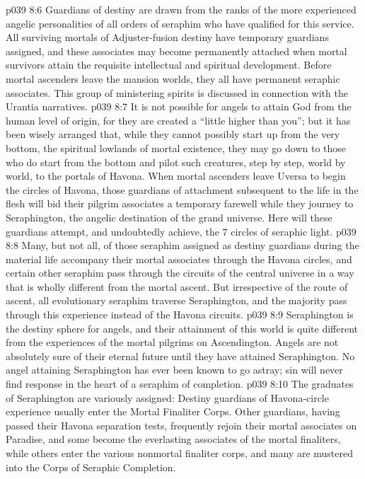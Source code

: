 \vs p039 8:6 Guardians of destiny are drawn from the ranks of the more experienced angelic personalities of all orders of seraphim who have qualified for this service. All surviving mortals of Adjuster\hyp{}fusion destiny have temporary guardians assigned, and these associates may become permanently attached when mortal survivors attain the requisite intellectual and spiritual development. Before mortal ascenders leave the mansion worlds, they all have permanent seraphic associates. This group of ministering spirits is discussed in connection with the Urantia narratives.
\vs p039 8:7 \pc It is not possible for angels to attain God from the human level of origin, for they are created a “little higher than you”; but it has been wisely arranged that, while they cannot possibly start up from the very bottom, the spiritual lowlands of mortal existence, they may go down to those who do start from the bottom and pilot such creatures, step by step, world by world, to the portals of Havona. When mortal ascenders leave Uversa to begin the circles of Havona, those guardians of attachment subsequent to the life in the flesh will bid their pilgrim associates a temporary farewell while they journey to Seraphington, the angelic destination of the grand universe. Here will these guardians attempt, and undoubtedly achieve, the 7 circles of seraphic light.
\vs p039 8:8 Many, but not all, of those seraphim assigned as destiny guardians during the material life accompany their mortal associates through the Havona circles, and certain other seraphim pass through the circuits of the central universe in a way that is wholly different from the mortal ascent. But irrespective of the route of ascent, all evolutionary seraphim traverse Seraphington, and the majority pass through this experience instead of the Havona circuits.
\vs p039 8:9 \pc Seraphington is the destiny sphere for angels, and their attainment of this world is quite different from the experiences of the mortal pilgrims on Ascendington. Angels are not absolutely sure of their eternal future until they have attained Seraphington. No angel attaining Seraphington has ever been known to go astray; sin will never find response in the heart of a seraphim of completion.
\vs p039 8:10 The graduates of Seraphington are variously assigned: Destiny guardians of Havona\hyp{}circle experience usually enter the Mortal Finaliter Corps. Other guardians, having passed their Havona separation tests, frequently rejoin their mortal associates on Paradise, and some become the everlasting associates of the mortal finaliters, while others enter the various nonmortal finaliter corps, and many are mustered into the Corps of Seraphic Completion.
